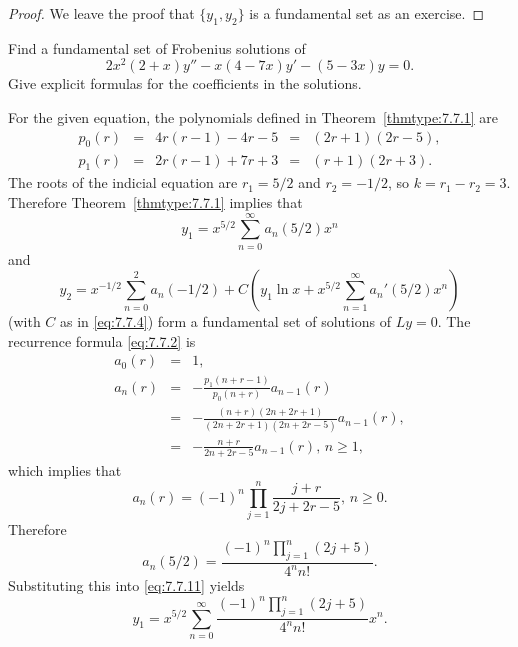 \documentclass{ximera}
\begin{document}
\begin{proof}
We leave the proof that $\{y_1,y_2\}$ is a fundamental set as an
exercise. %
\end{proof}

\begin{example}\label{example:7.7.1}
Find a fundamental set of Frobenius  solutions of
$$
2x^2(2+x)y''-x(4-7x)y'-(5-3x)y=0.
$$
Give explicit  formulas for the coefficients in the solutions.

\begin{explanation}
For  the given equation, the polynomials defined in
Theorem~\ref{thmtype:7.7.1} are
$$
\begin{array}{ccccc}
p_0(r)&=&4r(r-1)-4r-5&=&(2r+1)(2r-5),\\
p_1(r)&=&2r(r-1)+7r+3&=&(r+1)(2r+3).
\end{array}
$$
The roots of the indicial equation are $r_1=5/2$ and $r_2=-1/2$,
so $k=r_1-r_2=3$. Therefore Theorem~\ref{thmtype:7.7.1} implies that
\begin{equation} \label{eq:7.7.11}
y_1=x^{5/2}\sum_{n=0}^\infty a_n(5/2)x^n
\end{equation}
and
\begin{equation} \label{eq:7.7.12}
y_2=x^{-1/2}\sum_{n=0}^2a_n(-1/2)+C\left(y_1\ln
x+x^{5/2}\sum_{n=1}^\infty a_n'(5/2)x^n\right)
\end{equation}
(with $C$ as in \eqref{eq:7.7.4})
form a fundamental set of solutions of $Ly=0$. The recurrence
formula \eqref{eq:7.7.2} is
\begin{equation} \label{eq:7.7.13}
\begin{array}{ccl}
a_0(r)&=&1,\\
a_n(r)&=&-\frac{p_1(n+r-1)}{p_0(n+r)}a_{n-1}(r)\\
&=&-\frac{(n+r)(2n+2r+1)}{(2n+2r+1)(2n+2r-5)}a_{n-1}(r),\\
&=&-\frac{n+r}{2n+2r-5}a_{n-1}(r),\,n\geq 1,
\end{array}
\end{equation}
which implies that
\begin{equation} \label{eq:7.7.14}
a_n(r)=(-1)^n\prod_{j=1}^n\frac{j+r}{2j+2r-5},\,n\geq 0.
\end{equation}
Therefore
\begin{equation} \label{eq:7.7.15}
a_n(5/2)=\frac{(-1)^n\prod_{j=1}^n(2j+5)}{4^nn!}.
\end{equation}
Substituting this into \eqref{eq:7.7.11} yields
$$
y_1=x^{5/2}\sum_{n=0}^\infty\frac{(-1)^n\prod_{j=1}^n(2j+5)}{4^nn!}x^n.
$$


\end{explanation}
\end{example}
\end{document}

